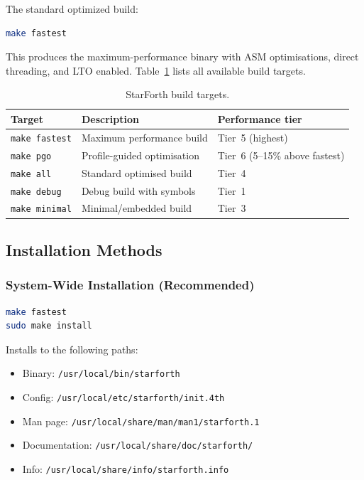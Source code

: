 The standard optimized build:

\begin{lstlisting}[language=bash]
make fastest
\end{lstlisting}

This produces the maximum-performance binary with ASM optimisations, direct
threading, and LTO enabled.  Table~\ref{tab:install-targets} lists all
available build targets.

\begin{table}[h]
  \centering
  \begin{tabular}{lll}
    \toprule
    Target            & Description                        & Performance tier \\
    \midrule
    \texttt{make fastest} & Maximum performance build      & Tier~5 (highest) \\
    \texttt{make pgo}     & Profile-guided optimisation    & Tier~6 (5--15\% above fastest) \\
    \texttt{make all}     & Standard optimised build       & Tier~4 \\
    \texttt{make debug}   & Debug build with symbols       & Tier~1 \\
    \texttt{make minimal} & Minimal/embedded build         & Tier~3 \\
    \bottomrule
  \end{tabular}
  \caption{StarForth build targets.}
  \label{tab:install-targets}
\end{table}

\subsection{Installation Methods}
\label{sec:install-methods}

\subsubsection{System-Wide Installation (Recommended)}

\begin{lstlisting}[language=bash]
make fastest
sudo make install
\end{lstlisting}

Installs to the following paths:

\begin{itemize}
  \item Binary: \texttt{/usr/local/bin/starforth}
  \item Config: \texttt{/usr/local/etc/starforth/init.4th}
  \item Man page: \texttt{/usr/local/share/man/man1/starforth.1}
  \item Documentation: \texttt{/usr/local/share/doc/starforth/}
  \item Info: \texttt{/usr/local/share/info/starforth.info}
\end{itemize}

